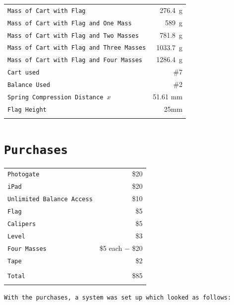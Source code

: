\documentclass{article}
\begin{document}
\begin{center}
\begin{tabular}{lr}
\texttt{Mass of Cart with Flag} & \SI{276.4}{\gram}\\
\texttt{Mass of Cart with Flag and One Mass} & \SI{589}{\gram}\\
\texttt{Mass of Cart with Flag and Two Masses} & \SI{781.8}{\gram}\\
\texttt{Mass of Cart with Flag and Three Masses} & \SI{1033.7}{\gram}\\
\texttt{Mass of Cart with Flag and Four Masses} & \SI{1286.4}{\gram}\\
\texttt{Cart used} & \#7\\
\texttt{Balance Used} & \#2\\
\texttt{Spring Compression Distance $x$} & {51.61 mm}\\
\texttt{Flag Height} & {25mm} \\\\
\end{tabular}
\end{center}

\section{\texttt{Purchases}}

\begin{center}
\begin{tabular}{lr}

\texttt{Photogate} & \$20\\
\texttt{iPad} & \$20\\
\texttt{Unlimited Balance Access} & \$10\\
\texttt{Flag} & \$5\\
\texttt{Calipers} & \$5\\
\texttt{Level} & \$3\\
\texttt{Four Masses} & \$5 each $-$ \$20\\
\texttt{Tape} & \$2\\\\
\hline
\texttt{Total} & \$85 \\\\
\end{tabular}
\end{center}

\texttt{With the purchases, a system was set up which looked as follows:\\\\\\}
\end{document}
